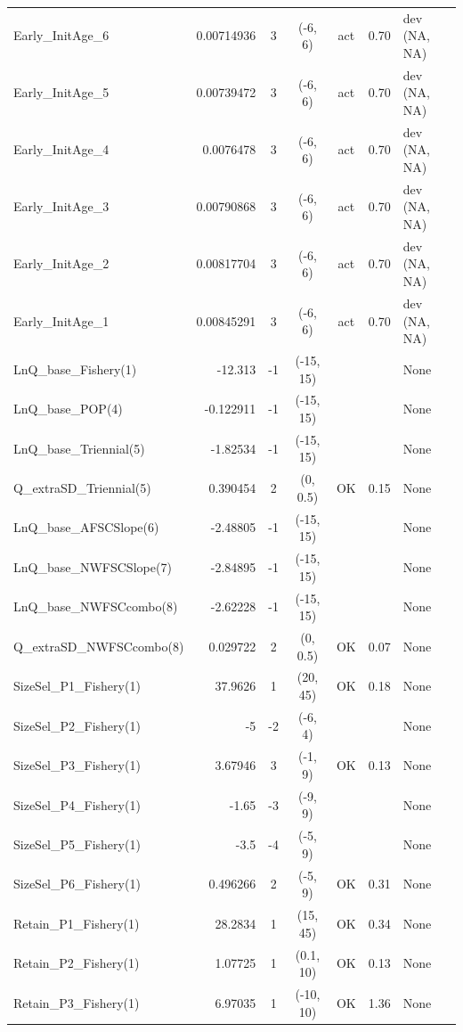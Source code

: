 \documentclass[12pt,]{article}
\begin{document}
\begin{landscape}
\begin{longtable}{lrcccll}
  Early\_InitAge\_6 & 0.00714936 & 3 & (-6, 6) & act & 0.70 & dev (NA, NA) \\ 
  Early\_InitAge\_5 & 0.00739472 & 3 & (-6, 6) & act & 0.70 & dev (NA, NA) \\ 
  Early\_InitAge\_4 & 0.0076478 & 3 & (-6, 6) & act & 0.70 & dev (NA, NA) \\ 
  Early\_InitAge\_3 & 0.00790868 & 3 & (-6, 6) & act & 0.70 & dev (NA, NA) \\ 
  Early\_InitAge\_2 & 0.00817704 & 3 & (-6, 6) & act & 0.70 & dev (NA, NA) \\ 
  Early\_InitAge\_1 & 0.00845291 & 3 & (-6, 6) & act & 0.70 & dev (NA, NA) \\ 
  LnQ\_base\_Fishery(1) & -12.313 & -1 & (-15, 15) &  &  & None \\ 
  LnQ\_base\_POP(4) & -0.122911 & -1 & (-15, 15) &  &  & None \\ 
  LnQ\_base\_Triennial(5) & -1.82534 & -1 & (-15, 15) &  &  & None \\ 
  Q\_extraSD\_Triennial(5) & 0.390454 & 2 & (0, 0.5) & OK & 0.15 & None \\ 
  LnQ\_base\_AFSCSlope(6) & -2.48805 & -1 & (-15, 15) &  &  & None \\ 
  LnQ\_base\_NWFSCSlope(7) & -2.84895 & -1 & (-15, 15) &  &  & None \\ 
  LnQ\_base\_NWFSCcombo(8) & -2.62228 & -1 & (-15, 15) &  &  & None \\ 
  Q\_extraSD\_NWFSCcombo(8) & 0.029722 & 2 & (0, 0.5) & OK & 0.07 & None \\ 
  SizeSel\_P1\_Fishery(1) & 37.9626 & 1 & (20, 45) & OK & 0.18 & None \\ 
  SizeSel\_P2\_Fishery(1) & -5 & -2 & (-6, 4) &  &  & None \\ 
  SizeSel\_P3\_Fishery(1) & 3.67946 & 3 & (-1, 9) & OK & 0.13 & None \\ 
  SizeSel\_P4\_Fishery(1) & -1.65 & -3 & (-9, 9) &  &  & None \\ 
  SizeSel\_P5\_Fishery(1) & -3.5 & -4 & (-5, 9) &  &  & None \\ 
  SizeSel\_P6\_Fishery(1) & 0.496266 & 2 & (-5, 9) & OK & 0.31 & None \\ 
  Retain\_P1\_Fishery(1) & 28.2834 & 1 & (15, 45) & OK & 0.34 & None \\ 
  Retain\_P2\_Fishery(1) & 1.07725 & 1 & (0.1, 10) & OK & 0.13 & None \\ 
  Retain\_P3\_Fishery(1) & 6.97035 & 1 & (-10, 10) & OK & 1.36 & None \\ 

\end{longtable}
\end{landscape}
\end{document}
